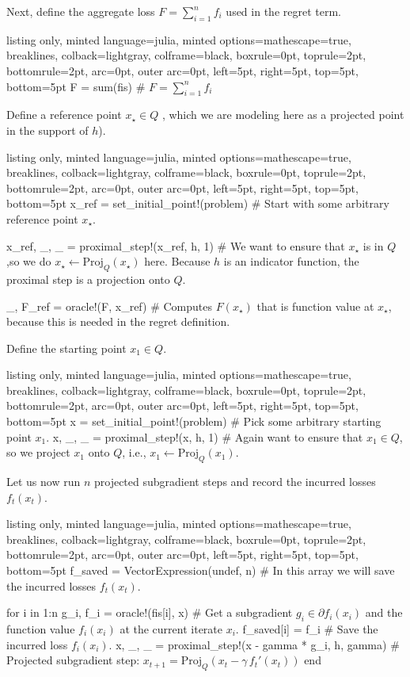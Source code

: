 \documentclass{article}
\begin{document}
Next, define the aggregate loss $F=\sum_{i=1}^n f_i$ used in the regret term.

\begin{tcblisting}{listing only, minted language=julia, minted options={mathescape=true, breaklines}, colback=lightgray, colframe=black, boxrule=0pt, toprule=2pt, bottomrule=2pt, arc=0pt, outer arc=0pt, left=5pt, right=5pt, top=5pt, bottom=5pt}
F = sum(fis) #  $F=\sum_{i=1}^n f_i$
\end{tcblisting}


Define a reference point $x_\star\in Q$ , which we are modeling here as a projected point in the support of $h$).

\begin{tcblisting}{listing only, minted language=julia, minted options={mathescape=true, breaklines}, colback=lightgray, colframe=black, boxrule=0pt, toprule=2pt, bottomrule=2pt, arc=0pt, outer arc=0pt, left=5pt, right=5pt, top=5pt, bottom=5pt}
x_ref = set_initial_point!(problem) # Start with some arbitrary reference point $x_\star$.

x_ref, _, _ = proximal_step!(x_ref, h, 1) # We want to ensure that $x_\star$ is in $Q$,so we do  $x_\star \gets \mathrm{Proj}_Q(x_\star)$ here. Because $h$ is an indicator function, the proximal step is a projection onto $Q$.

_, F_ref = oracle!(F, x_ref) # Computes  $F(x_\star)$ that is function value at $x_\star$, because this is needed in the regret definition.
\end{tcblisting}


Define the starting point $x_1\in Q$.

\begin{tcblisting}{listing only, minted language=julia, minted options={mathescape=true, breaklines}, colback=lightgray, colframe=black, boxrule=0pt, toprule=2pt, bottomrule=2pt, arc=0pt, outer arc=0pt, left=5pt, right=5pt, top=5pt, bottom=5pt}
x = set_initial_point!(problem) # Pick some arbitrary starting point $x_1$.
x, _, _ = proximal_step!(x, h, 1) # Again want to ensure that $x_1 \in Q$, so we project $x_1$ onto $Q$, i.e., $x_1 \gets \mathrm{Proj}_Q(x_1)$.
\end{tcblisting}


Let us now run $n$ projected subgradient steps and record the incurred losses $f_t(x_t)$.

\begin{tcblisting}{listing only, minted language=julia, minted options={mathescape=true, breaklines}, colback=lightgray, colframe=black, boxrule=0pt, toprule=2pt, bottomrule=2pt, arc=0pt, outer arc=0pt, left=5pt, right=5pt, top=5pt, bottom=5pt}
f_saved = Vector{Expression}(undef, n) # In this array we will save the incurred losses $f_t(x_t)$.

for i in 1:n
    g_i, f_i = oracle!(fis[i], x) # Get a subgradient $g_i \in \partial f_i(x_i)$ and the function value $f_i(x_i)$ at the current iterate $x_i$.
    f_saved[i] = f_i # Save the incurred loss $f_i(x_i)$.
    x, _, _ = proximal_step!(x - gamma * g_i, h, gamma) # Projected subgradient step: $x_{t+1} = \mathrm{Proj}_Q\!\left(x_t - \gamma \, f_t'(x_t)\right)$
end
\end{tcblisting}
\end{document}
